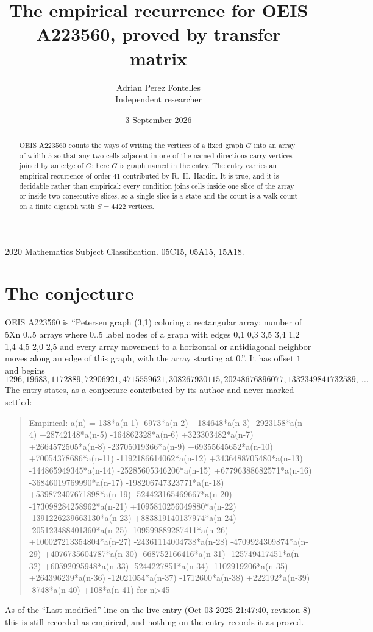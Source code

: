 \documentclass[11pt,a4paper]{article}
\title{The empirical recurrence for OEIS A223560, proved by transfer matrix}
\author{Adrian Perez Fontelles\\ \small Independent researcher}
\date{3 September 2026}
\theoremstyle{plain}
\theoremstyle{definition}
\begin{document}
\maketitle

\begin{abstract}
OEIS A223560 counts the ways of writing the vertices of a fixed graph $G$ into an array of width
$5$ so that any two cells adjacent in one of the named directions carry vertices joined by an
edge of $G$; here $G$ is graph named in the entry. The entry carries an empirical recurrence of order $41$
contributed by R.~H.~Hardin. It is true, and it is decidable rather than empirical: every
condition joins cells inside one slice of the array or inside two consecutive slices, so a
single slice is a state and the count is a walk count on a finite digraph with $S=4422$ vertices.
\end{abstract}

\noindent\small 2020 Mathematics Subject Classification. 05C15, 05A15, 15A18.\normalsize

\section{The conjecture}

OEIS A223560 is ``Petersen graph (3,1) coloring a rectangular array: number of 5Xn 0..5 arrays where 0..5 label nodes of a graph with edges 0,1 0,3 3,5 3,4 1,2 1,4 4,5 2,0 2,5 and every array movement to a horizontal or antidiagonal neighbor moves along an edge of this graph, with the array starting at 0.''. It has offset $1$ and begins
\[
1296, 19683, 1172889, 72906921, 4715559621, 308267930115, 20248676896077, 1332349841732589,\ \dots
\]
The entry states, as a conjecture contributed by its author and never marked settled:
\begin{quote}
Empirical: a(n) = 138*a(n-1) -6973*a(n-2) +184648*a(n-3) -2923158*a(n-4) +28742148*a(n-5) -164862328*a(n-6) +323303482*a(n-7) +2664572505*a(n-8) -23705019366*a(n-9) +69355645652*a(n-10) +70054378686*a(n-11) -1192186614062*a(n-12) +3436488705480*a(n-13) -144865949345*a(n-14) -25285605346206*a(n-15) +67796388682571*a(n-16) -36846019769990*a(n-17) -198206747323771*a(n-18) +539872407671898*a(n-19) -524423165469667*a(n-20) -173098284258962*a(n-21) +1095810256049880*a(n-22) -1391226239663130*a(n-23) +883819140137974*a(n-24) -205123488401360*a(n-25) -109599889287411*a(n-26) +100027213354804*a(n-27) -24361114004738*a(n-28) -4709924309874*a(n-29) +4076735604787*a(n-30) -668752166416*a(n-31) -125749417451*a(n-32) +60592095948*a(n-33) -5244227851*a(n-34) -1102919206*a(n-35) +264396239*a(n-36) -12021054*a(n-37) -1712600*a(n-38) +222192*a(n-39) -8748*a(n-40) +108*a(n-41) for n>45
\end{quote}
As of the ``Last modified'' line on the live entry (Oct 03 2025 21:47:40, revision 8) this is still
recorded as empirical, and nothing on the entry records it as proved.
\end{document}
